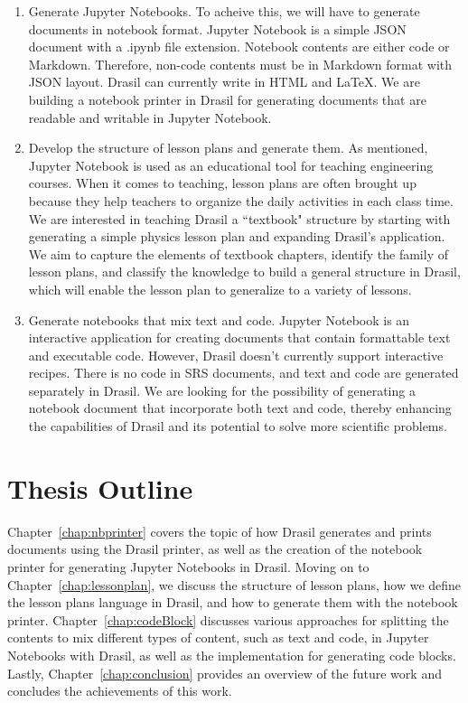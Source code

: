 \begin{enumerate}
	\item Generate Jupyter Notebooks. To acheive this, we will have 
	to generate documents in notebook format. Jupyter Notebook is a simple 
	JSON document with a .ipynb file extension. Notebook contents are either 
	code or Markdown. Therefore, non-code contents must be in Markdown format 
	with JSON layout. Drasil can currently write in HTML and LaTeX. We are 
	building a notebook printer in Drasil for generating documents that are 
	readable and writable in Jupyter Notebook.
	\item Develop the structure of lesson plans and generate them. As 
	mentioned, Jupyter Notebook is used as an educational tool for teaching 
	engineering courses. When it comes to teaching, lesson plans are often 
	brought up because they help teachers to organize the daily activities 
	in each class time. We are interested in teaching Drasil a ``textbook" 
	structure by starting with generating a simple physics lesson plan and 
	expanding Drasil's application. We aim to capture the elements of 
	textbook chapters, identify the family of lesson plans, and classify the 
	knowledge to build a general structure in Drasil, which will enable the 
	lesson plan to generalize to a variety of lessons.
	\item Generate notebooks that mix text and code. Jupyter Notebook is 
	an interactive application for creating documents that contain formattable 
	text and executable code. However, Drasil doesn't currently support 
	interactive recipes. There is no code in SRS documents, and text and code 
	are generated separately in Drasil. We are looking for the possibility of 
	generating a notebook document that incorporate both text and code, thereby 
	enhancing the capabilities of Drasil and its potential to solve more 
	scientific problems.
\end{enumerate}

\section{Thesis Outline}
Chapter~\ref{chap:nbprinter} covers the topic of how Drasil generates and 
prints documents using the Drasil printer, as well as the creation of the 
notebook printer for generating Jupyter Notebooks in Drasil. Moving on to 
Chapter~\ref{chap:lessonplan}, we discuss the structure of lesson plans, how we 
define the lesson plans language in Drasil, and how to generate them with the 
notebook printer. Chapter~\ref{chap:codeBlock} discusses various approaches for 
splitting the contents to mix different types of content, such as text and 
code, in Jupyter Notebooks with Drasil, as well as the implementation for 
generating code blocks. Lastly, Chapter~\ref{chap:conclusion} provides an 
overview of the future work and concludes the achievements of this work.